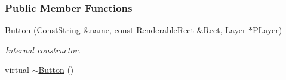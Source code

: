 \subsubsection*{Public Member Functions}
\begin{DoxyCompactItemize}
\item 
\hyperlink{classMezzanine_1_1UI_1_1Button_a910cce5a558e9f41ede146e9675b757f}{Button} (\hyperlink{namespaceMezzanine_a63cd699ac54b73953f35ec9cfc05e506}{ConstString} \&name, const \hyperlink{structMezzanine_1_1UI_1_1RenderableRect}{RenderableRect} \&Rect, \hyperlink{classMezzanine_1_1UI_1_1Layer}{Layer} $\ast$PLayer)
\begin{DoxyCompactList}\small\item\em Internal constructor. \item\end{DoxyCompactList}\item 
\hypertarget{classMezzanine_1_1UI_1_1Button_a8c84044c337735482919fcc82085cf46}{
virtual \hyperlink{classMezzanine_1_1UI_1_1Button_a8c84044c337735482919fcc82085cf46}{$\sim$Button} ()}
\label{classMezzanine_1_1UI_1_1Button_a8c84044c337735482919fcc82085cf46}


\end{DoxyCompactItemize}
